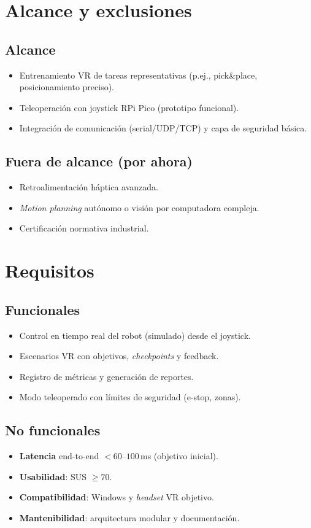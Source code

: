 \section{Alcance y exclusiones}
\subsection*{Alcance}
\begin{itemize}
  \item Entrenamiento VR de tareas representativas (p.ej., pick\&place, posicionamiento preciso).
  \item Teleoperación con joystick RPi Pico (prototipo funcional).
  \item Integración de comunicación (serial/UDP/TCP) y capa de seguridad básica.
\end{itemize}
\subsection*{Fuera de alcance (por ahora)}
\begin{itemize}
  \item Retroalimentación háptica avanzada.
  \item \textit{Motion planning} autónomo o visión por computadora compleja.
  \item Certificación normativa industrial.
\end{itemize}

\section{Requisitos}
\subsection{Funcionales}
\begin{itemize}
  \item Control en tiempo real del robot (simulado) desde el joystick.
  \item Escenarios VR con objetivos, \textit{checkpoints} y feedback.
  \item Registro de métricas y generación de reportes.
  \item Modo teleoperado con límites de seguridad (e-stop, zonas).
\end{itemize}
\subsection{No funcionales}
\begin{itemize}
  \item \textbf{Latencia} end-to-end $< 60$--$100$\,ms (objetivo inicial).
  \item \textbf{Usabilidad}: SUS $\geq 70$.
  \item \textbf{Compatibilidad}: Windows y \textit{headset} VR objetivo.
  \item \textbf{Mantenibilidad}: arquitectura modular y documentación.
\end{itemize}

